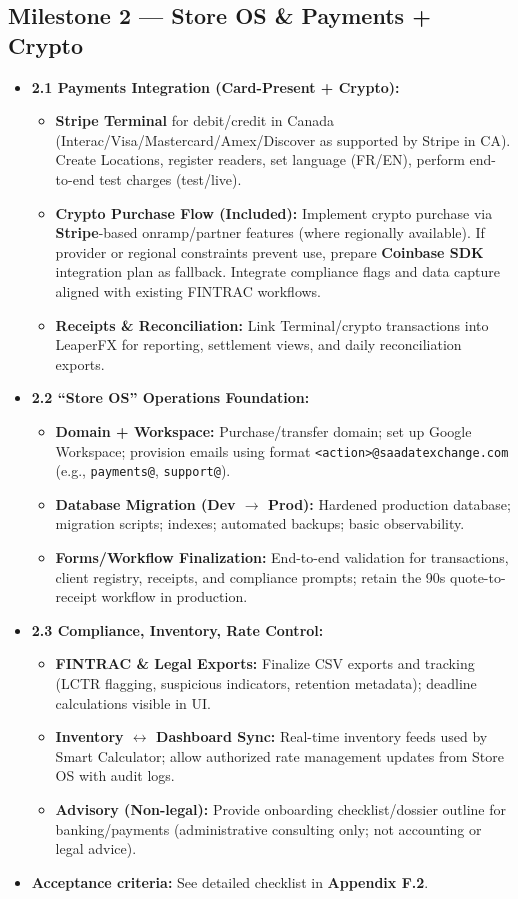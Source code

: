 \documentclass[11pt, a4paper]{article}
\begin{document}
\subsection{Milestone 2 — Store OS \& Payments + Crypto}
\begin{itemize}[leftmargin=*]
  \item \textbf{2.1 Payments Integration (Card-Present + Crypto):}
    \begin{itemize}
      \item \textbf{Stripe Terminal} for debit/credit in Canada (Interac/Visa/Mastercard/Amex/Discover as supported by Stripe in CA). Create Locations, register readers, set language (FR/EN), perform end-to-end test charges (test/live).
      \item \textbf{Crypto Purchase Flow (Included):} Implement crypto purchase via \textbf{Stripe}-based onramp/partner features (where regionally available). If provider or regional constraints prevent use, prepare \textbf{Coinbase SDK} integration plan as fallback. Integrate compliance flags and data capture aligned with existing FINTRAC workflows.
      \item \textbf{Receipts \& Reconciliation:} Link Terminal/crypto transactions into LeaperFX for reporting, settlement views, and daily reconciliation exports.
    \end{itemize}
  \item \textbf{2.2 ``Store OS'' Operations Foundation:}
    \begin{itemize}
      \item \textbf{Domain + Workspace:} Purchase/transfer domain; set up Google Workspace; provision emails using format \texttt{<action>@saadatexchange.com} (e.g., \texttt{payments@}, \texttt{support@}).
      \item \textbf{Database Migration (Dev $\rightarrow$ Prod):} Hardened production database; migration scripts; indexes; automated backups; basic observability.
      \item \textbf{Forms/Workflow Finalization:} End-to-end validation for transactions, client registry, receipts, and compliance prompts; retain the 90s quote-to-receipt workflow in production.
    \end{itemize}
  \item \textbf{2.3 Compliance, Inventory, Rate Control:}
    \begin{itemize}
      \item \textbf{FINTRAC \& Legal Exports:} Finalize CSV exports and tracking (LCTR flagging, suspicious indicators, retention metadata); deadline calculations visible in UI.
      \item \textbf{Inventory $\leftrightarrow$ Dashboard Sync:} Real-time inventory feeds used by Smart Calculator; allow authorized rate management updates from Store OS with audit logs.
      \item \textbf{Advisory (Non-legal):} Provide onboarding checklist/dossier outline for banking/payments (administrative consulting only; not accounting or legal advice).
    \end{itemize}
  \item \textbf{Acceptance criteria:} See detailed checklist in \textbf{Appendix F.2}.
\end{itemize}
\end{document}
